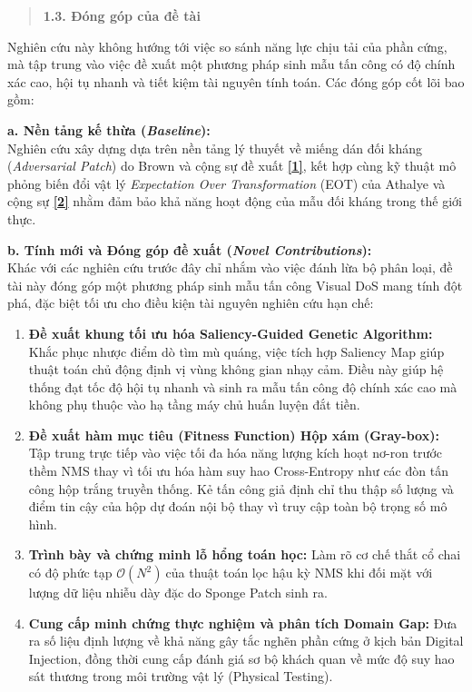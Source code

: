 \begin{quote}
\textbf{1.3. Đóng góp của đề tài}
\end{quote}

Nghiên cứu này không hướng tới việc so sánh năng lực chịu tải của phần
cứng, mà tập trung vào việc đề xuất một phương pháp sinh mẫu tấn công có
độ chính xác cao, hội tụ nhanh và tiết kiệm tài nguyên tính toán. Các
đóng góp cốt lõi bao gồm:

\textbf{a. Nền tảng kế thừa (\emph{Baseline}):}\\
Nghiên cứu xây dựng dựa trên nền tảng lý thuyết về miếng dán đối kháng
(\emph{Adversarial Patch}) do Brown và cộng sự đề xuất
\hyperref[TL1]{\textbf{{[}1{]}}}, kết hợp cùng kỹ thuật mô phỏng biến
đổi vật lý \emph{Expectation Over Transformation} (EOT) của Athalye và
cộng sự \hyperref[TL2]{\textbf{{[}2{]}}} nhằm đảm bảo khả năng hoạt động
của mẫu đối kháng trong thế giới thực.

\textbf{b. Tính mới và Đóng góp đề xuất (\emph{Novel Contributions}):}\\
Khác với các nghiên cứu trước đây chỉ nhắm vào việc đánh lừa bộ phân
loại, đề tài này đóng góp một phương pháp sinh mẫu tấn công Visual DoS
mang tính đột phá, đặc biệt tối ưu cho điều kiện tài nguyên nghiên cứu
hạn chế:

\begin{enumerate}
\def\labelenumi{\arabic{enumi}.}
\item
  \textbf{Đề xuất khung tối ưu hóa Saliency-Guided Genetic Algorithm:}
  Khắc phục nhược điểm dò tìm mù quáng, việc tích hợp Saliency Map giúp
  thuật toán chủ động định vị vùng không gian nhạy cảm. Điều này giúp hệ
  thống đạt tốc độ hội tụ nhanh và sinh ra mẫu tấn công độ chính xác cao
  mà không phụ thuộc vào hạ tầng máy chủ huấn luyện đắt tiền.
\item
  \textbf{Đề xuất hàm mục tiêu (Fitness Function) Hộp xám (Gray-box):}
  Tập trung trực tiếp vào việc tối đa hóa năng lượng kích hoạt nơ-ron
  trước thềm NMS thay vì tối ưu hóa hàm suy hao Cross-Entropy như các
  đòn tấn công hộp trắng truyền thống. Kẻ tấn công giả định chỉ thu thập
  số lượng và điểm tin cậy của hộp dự đoán nội bộ thay vì truy cập toàn
  bộ trọng số mô hình.
\item
  \textbf{Trình bày và chứng minh lỗ hổng toán học:} Làm rõ cơ chế thắt
  cổ chai có độ phức tạp \(\mathcal{O}\left( N^{2} \right)\ \)của thuật
  toán lọc hậu kỳ NMS khi đối mặt với lượng dữ liệu nhiễu dày đặc do
  Sponge Patch sinh ra.
\item
  \textbf{Cung cấp minh chứng thực nghiệm và phân tích Domain Gap:} Đưa
  ra số liệu định lượng về khả năng gây tắc nghẽn phần cứng ở kịch bản
  Digital Injection, đồng thời cung cấp đánh giá sơ bộ khách quan về mức
  độ suy hao sát thương trong môi trường vật lý (Physical Testing).
\end{enumerate}

